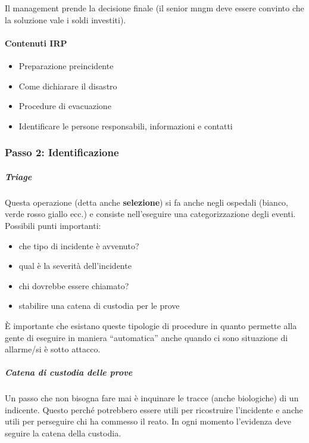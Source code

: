 Il management prende la decisione finale (il senior mngm deve essere convinto
che la soluzione vale i soldi investiti).

\paragraph*{Contenuti IRP}

\begin{itemize}
\item Preparazione preincidente
\item Come dichiarare il disastro
\item Procedure di evacuazione
\item Identificare le persone responsabili, informazioni e contatti
\end{itemize}

\subsubsection{Passo 2: Identificazione}
\subparagraph*{Triage} Questa operazione (detta anche \textbf{selezione}) si fa
anche negli ospedali (bianco, verde rosso giallo ecc.) e consiste nell'eseguire
una categorizzazione degli eventi. Possibili punti importanti:
\begin{itemize}
\item che tipo di incidente è avvenuto?
\item qual è la severità dell'incidente
\item chi dovrebbe essere chiamato?
\item stabilire una catena di custodia per le prove
\end{itemize}
È importante che esistano queste tipologie di procedure in quanto permette alla
gente di eseguire in maniera ``automatica'' anche quando ci sono situazione di
allarme/si è sotto attacco.

\subparagraph*{Catena di custodia delle prove} Un passo che non bisogna fare mai
è inquinare le tracce (anche biologiche) di un indicente. Questo perché
potrebbero essere utili per ricostruire l'incidente e anche utili per perseguire
chi ha commesso il reato.
In ogni momento l'evidenza deve seguire la catena della custodia. %


